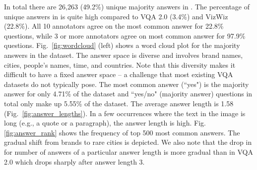 \documentclass[10pt,twocolumn,letterpaper]{article}
\begin{document}
In total there are 26,263 (49.2\%) unique majority answers in \datasetName. The percentage of unique answers in \datasetName is quite high compared to VQA 2.0 (3.4\%) and VizWiz (22.8\%). All 10 annotators agree on the most common answer for 22.8\% questions, while 3 or more annotators agree on most common answer for 97.9\% questions. Fig.~\ref{fig:wordcloud} (left) shows a word cloud plot for the majority answers in the dataset. The answer space is diverse and involves brand names, cities, people's names, time, and countries. Note that this diversity makes it difficult to have a fixed answer space -- a challenge that most existing VQA datasets do not typically pose. The most common answer (``yes") is the majority answer for only 4.71\%  of the dataset and ``yes/no" (majority answer) questions in total only make up 5.55\% of the dataset. The average answer length is 1.58 (Fig.~\ref{fig:answer_lengths}).
In a few occurrences where the text in the image is long (e.g., a quote or a paragraph), the answer length is high.  Fig. \ref{fig:answer_rank} shows the frequency of top 500 most common answers. The gradual shift from brands to rare cities is depicted. We also note that the drop in \datasetName for number of answers of a particular answer length is more gradual than in VQA 2.0 which drops sharply after answer length 3.
\end{document}
